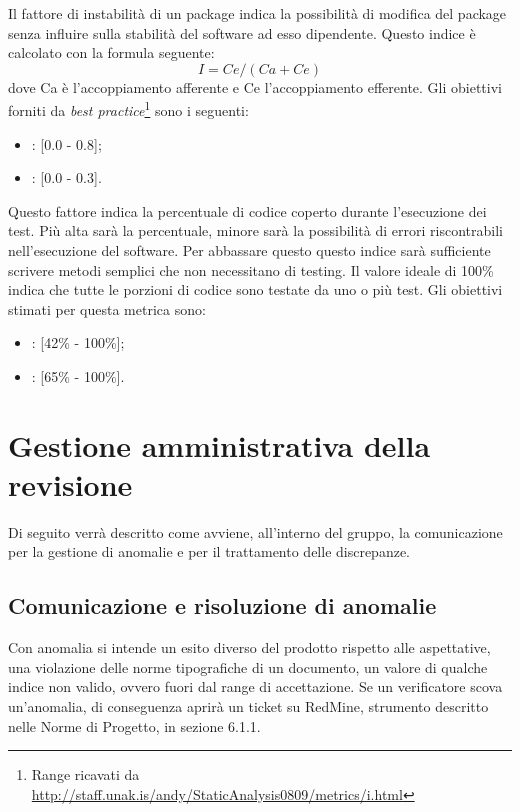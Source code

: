 \label{4.2.8}
Il fattore di instabilità di un package indica la possibilità di modifica del package senza influire sulla stabilità del software ad esso dipendente.
Questo indice è calcolato con la formula seguente:
$$I = Ce / (Ca + Ce)$$
dove Ca è l'accoppiamento afferente e Ce l'accoppiamento efferente.
Gli obiettivi forniti da \emph{best practice}\footnote{Range ricavati da \url{http://staff.unak.is/andy/StaticAnalysis0809/metrics/i.html}} sono i seguenti:
\begin{itemize}
\item {}: [0.0 - 0.8];
\item {}: [0.0 - 0.3].
\end{itemize}

\label{4.2.9}
Questo fattore indica la percentuale di codice coperto durante l'esecuzione dei test. Più alta sarà la percentuale, minore sarà la possibilità di errori riscontrabili nell'esecuzione del software. Per abbassare questo questo indice sarà sufficiente scrivere metodi semplici che non necessitano di testing. Il valore ideale di 100\% indica che tutte le porzioni di codice sono testate da uno o più test.
Gli obiettivi stimati per questa metrica sono:
\begin{itemize}
\item {}: [42\% - 100\%];
\item {}: [65\% - 100\%].
\end{itemize}



\newpage
\section{Gestione amministrativa della revisione}
Di seguito verrà descritto come avviene, all'interno del gruppo, la comunicazione per la gestione di anomalie e per il trattamento delle discrepanze.
\label{3.0}
\subsection{Comunicazione e risoluzione di anomalie}
Con anomalia si intende un esito diverso del prodotto rispetto alle aspettative, una violazione delle norme tipografiche di un documento, un valore di qualche indice non valido, ovvero fuori dal range di accettazione. 
Se un verificatore scova un'anomalia, di conseguenza aprirà un ticket su RedMine, strumento descritto nelle Norme di Progetto, in sezione 6.1.1.
\label{3.1}

